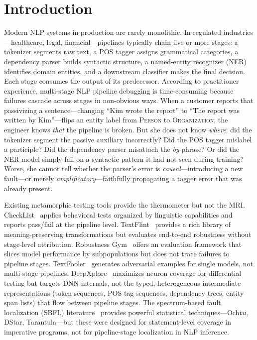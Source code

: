 \documentclass[sigconf,nonacm]{acmart}
\begin{document}
\maketitle

\section{Introduction}\label{sec:intro}

Modern NLP systems in production are rarely monolithic.
In regulated industries---healthcare, legal, financial---pipelines typically chain five or more stages: a tokenizer segments raw text, a POS tagger assigns grammatical categories, a dependency parser builds syntactic structure, a named-entity recognizer (NER) identifies domain entities, and a downstream classifier makes the final decision.
Each stage consumes the output of its predecessor.
According to practitioner experience, multi-stage NLP pipeline debugging is time-consuming because failures cascade across stages in non-obvious ways.
When a customer reports that passivizing a sentence---changing ``Kim wrote the report'' to ``The report was written by Kim''---flips an entity label from \textsc{Person} to \textsc{Organization}, the engineer knows \emph{that} the pipeline is broken.
But she does not know \emph{where}: did the tokenizer segment the passive auxiliary incorrectly?
Did the POS tagger mislabel a participle?
Did the dependency parser misattach the \emph{by}-phrase?
Or did the NER model simply fail on a syntactic pattern it had not seen during training?
Worse, she cannot tell whether the parser's error is \emph{causal}---introducing a new fault---or merely \emph{amplificatory}---faithfully propagating a tagger error that was already present.

Existing metamorphic testing tools provide the thermometer but not the MRI\@.
CheckList~\cite{ribeiro2020beyond} applies behavioral tests organized by linguistic capabilities and reports pass/fail at the pipeline level.
TextFlint~\cite{gui2021textflint} provides a rich library of meaning-preserving transformations but evaluates end-to-end robustness without stage-level attribution.
Robustness Gym~\cite{goel2021robustness} offers an evaluation framework that slices model performance by subpopulations but does not trace failures to pipeline stages.
TextFooler~\cite{jin2020bert} generates adversarial examples for single models, not multi-stage pipelines.
DeepXplore~\cite{pei2017deepxplore} maximizes neuron coverage for differential testing but targets DNN internals, not the typed, heterogeneous intermediate representations (token sequences, POS tag sequences, dependency trees, entity span lists) that flow between pipeline stages.
The spectrum-based fault localization (SBFL) literature~\cite{wong2016survey,jones2002visualization,abreu2007accuracy} provides powerful statistical techniques---Ochiai, DStar, Tarantula---but these were designed for statement-level coverage in imperative programs, not for pipeline-stage localization in NLP inference.
\end{document}
